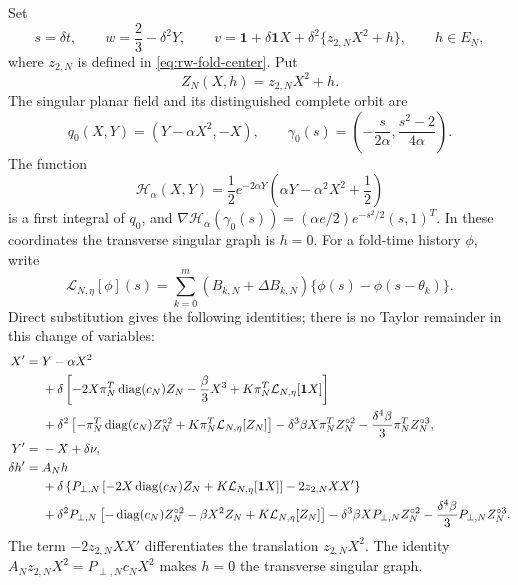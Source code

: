 Set
\[
 s=\delta t,\qquad
 w=\frac23-\delta^2Y,\qquad
 v=\mathbf1+\delta\mathbf1X
       +\delta^2\{z_{2,N}X^2+h\},
 \qquad h\in E_N,
\]
where \(z_{2,N}\) is defined in \cref{eq:rw-fold-center}.
Put
\[
 Z_N(X,h)=z_{2,N}X^2+h.
\]
The singular planar field and its distinguished complete orbit are
\begin{equation}
 q_0(X,Y)=(Y-\alpha X^2,-X),
 \qquad
 \gamma_0(s)=\left(-\frac{s}{2\alpha},
                    \frac{s^2-2}{4\alpha}\right).
 \label{eq:fold-singular-orbit}
\end{equation}
The function
\begin{equation}
 \mathscr H_\alpha(X,Y)
 =\frac12e^{-2\alpha Y}
   \left(\alpha Y-\alpha^2X^2+\frac12\right)
 \label{eq:fold-first-integral}
\end{equation}
is a first integral of \(q_0\), and
\(\nabla\mathscr H_\alpha(\gamma_0(s))
 =(\alpha e/2)e^{-s^2/2}(s,1)^T\).
In these coordinates the transverse singular graph is \(h=0\).  For a
fold-time history \(\phi\), write
\[
 \mathcal L_{N,\eta}[\phi](s)
 =\sum_{k=0}^m(B_{k,N}+\Delta B_{k,N})
       \{\phi(s)-\phi(s-\theta_k)\}.
\]
Direct substitution gives the following identities; there is no Taylor
remainder in this change of variables:
\begin{subequations}\label{eq:fold-exact-system}
\begin{align}
 X'={}&Y-\alpha X^2\notag\\
 &+\delta\left[-2X\pi_N^T\operatorname{diag}(c_N)Z_N
          -\frac\beta3X^3
          +K\pi_N^T\mathcal L_{N,\eta}[\mathbf1X]\right]\notag\\
 &+\delta^2\left[-\pi_N^T\operatorname{diag}(c_N)Z_N^{\circ2}
          +K\pi_N^T\mathcal L_{N,\eta}[Z_N]\right]
 -\delta^3\beta X\pi_N^TZ_N^{\circ2}
 -\frac{\delta^4\beta}{3}\pi_N^TZ_N^{\circ3},
                                                        \label{eq:fold-exact-X}\\
 Y'={}&-X+\delta\nu,                                  \label{eq:fold-exact-Y}\\
 \delta h'={}&A_Nh\notag\\
 &+\delta\left\{P_{\perp,N}\left[-2X\operatorname{diag}(c_N)Z_N
               +K\mathcal L_{N,\eta}[\mathbf1X]\right]
               -2z_{2,N}X X'\right\}\notag\\
 &+\delta^2P_{\perp,N}\left[-\operatorname{diag}(c_N)Z_N^{\circ2}
             -\beta X^2Z_N+K\mathcal L_{N,\eta}[Z_N]\right]
 -\delta^3\beta X P_{\perp,N}Z_N^{\circ2}
 -\frac{\delta^4\beta}{3}P_{\perp,N}Z_N^{\circ3}.
                                                        \label{eq:fold-exact-h}
\end{align}
\end{subequations}
The term \(-2z_{2,N}XX'\) differentiates the translation
\(z_{2,N}X^2\).
The identity
\(A_Nz_{2,N}X^2=P_{\perp,N}c_NX^2\) makes \(h=0\) the transverse
singular graph.

